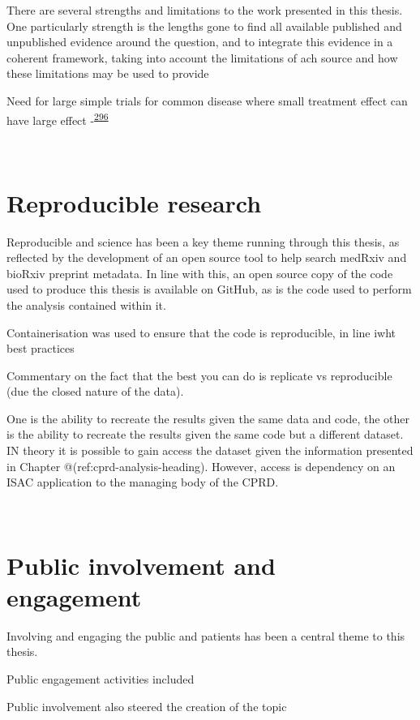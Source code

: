 \documentclass[a4paper, twoside]{templates/ociamthesis}
\begin{document}
There are several strengths and limitations to the work presented in this thesis. One particularly strength is the lengths gone to find all available published and unpublished evidence around the question, and to integrate this evidence in a coherent framework, taking into account the limitations of ach source and how these limitations may be used to provide

Need for large simple trials for common disease where small treatment effect can have large effect -\textsuperscript{\protect\hyperlink{ref-yusuf1984}{296}}

~

\hypertarget{reproducible-research}{%
\section{Reproducible research}\label{reproducible-research}}

Reproducible and science has been a key theme running through this thesis, as reflected by the development of an open source tool to help search medRxiv and bioRxiv preprint metadata. In line with this, an open source copy of the code used to produce this thesis is available on GitHub, as is the code used to perform the analysis contained within it.

Containerisation was used to ensure that the code is reproducible, in line iwht best practices

Commentary on the fact that the best you can do is replicate vs reproducible (due the closed nature of the data).

One is the ability to recreate the results given the same data and code, the other is the ability to recreate the results given the same code but a different dataset. IN theory it is possible to gain access the dataset given the information presented in Chapter @(ref:cprd-analysis-heading). However, access is dependency on an ISAC application to the managing body of the CPRD.

~

\hypertarget{disc-PPI}{%
\section{Public involvement and engagement}\label{disc-PPI}}

Involving and engaging the public and patients has been a central theme to this thesis.

Public engagement activities included

Public involvement also steered the creation of the topic
\end{document}

